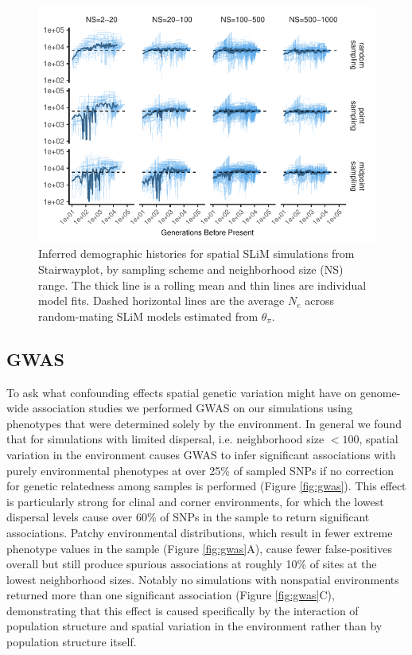 \documentclass[11pt,twoside,lineno]{preprint}
\begin{document}
\begin{figure}[p]
\centering
\includegraphics[width=\textwidth]{figures/stairwayplot_facet_rollmean.pdf}
\caption{Inferred demographic histories for spatial SLiM simulations from Stairwayplot, by sampling scheme and neighborhood size (NS) range. The thick line is a rolling mean and thin lines are individual model fits. Dashed horizontal lines are the average $N_{e}$ across random-mating SLiM models estimated from $\theta_{\pi}$.}
\label{fig:demography}
\end{figure}

\subsection{GWAS}
To ask what confounding effects spatial genetic variation might have on genome-wide association studies we performed GWAS on our simulations using phenotypes that were determined solely by the environment. In general we found that for simulations with limited dispersal, i.e. neighborhood size $< 100$, spatial variation in the environment causes GWAS to infer significant associations with purely environmental phenotypes at over 25\% of sampled SNPs if no correction for genetic relatedness among samples is performed (Figure \ref{fig:gwas}). This effect is particularly strong for clinal and corner environments, for which the lowest dispersal levels cause over 60\% of SNPs in the sample to return significant associations. Patchy environmental distributions, which result in fewer extreme phenotype values in the sample (Figure \ref{fig:gwas}A), cause fewer false-positives overall but still produce spurious associations at roughly 10\% of sites at the lowest neighborhood sizes. Notably no simulations with nonspatial environments returned more than one significant association (Figure \ref{fig:gwas}C), demonstrating that this effect is caused specifically by the interaction of population structure and spatial variation in the environment rather than by population structure itself.  
\end{document}
